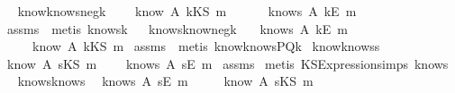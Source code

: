 \begin{isabellebody}
{\isafoldproof}\isadelimproof
\ \isanewline
\endisadelimproof
\isanewline
{}\isamarkupfalse \ know{}knows{\isacharunderscore}neg{\isacharunderscore}k{\isacharcolon}\ \isanewline
{}\ \ {\isachardoublequoteopen}{\isasymnot}\ know\ A\ {\isacharparenleft}kKS\ m{\isacharparenright}{\isachardoublequoteclose}\isanewline
{}\ \ \ \ \ {\isachardoublequoteopen}{\isasymnot}\ knows\ A\ {\isacharbrackleft}kE\ m{\isacharbrackright}{\isachardoublequoteclose}\isanewline
\isadelimproof
\endisadelimproof
\isatagproof
{}\isamarkupfalse \ assms\ \isamarkupfalse \ {\isacharparenleft}metis\ knows{}k{\isacharparenright}\endisatagproof
{\isafoldproof}\isadelimproof
\ \isanewline
\endisadelimproof
\isanewline
{}\isamarkupfalse \ knows{}know{\isacharunderscore}neg{\isacharunderscore}k{\isacharcolon}\ \isanewline
{}\ {\isachardoublequoteopen}{\isasymnot}\ knows\ A\ {\isacharbrackleft}kE\ m{\isacharbrackright}{\isachardoublequoteclose}\ \isanewline
{}\ \ \ \ {\isachardoublequoteopen}{\isasymnot}\ know\ A\ {\isacharparenleft}kKS\ m{\isacharparenright}{\isachardoublequoteclose}\isanewline
\isadelimproof
\endisadelimproof
\isatagproof
{}\isamarkupfalse \ assms\ \isamarkupfalse \ {\isacharparenleft}metis\ know{}knowsPQ{\isacharunderscore}k{\isacharparenright}\endisatagproof
{\isafoldproof}\isadelimproof
\isanewline
\endisadelimproof
\isanewline
{}\isamarkupfalse \ know{}knows{\isacharunderscore}s{\isacharcolon}\ \isanewline
{}\ {\isachardoublequoteopen}know\ A\ {\isacharparenleft}sKS\ m{\isacharparenright}{\isachardoublequoteclose}\isanewline
{}\ \ \ \ {\isachardoublequoteopen}knows\ A\ {\isacharbrackleft}sE\ m{\isacharbrackright}{\isachardoublequoteclose}\isanewline
\isadelimproof
\endisadelimproof
\isatagproof
{}\isamarkupfalse \ assms\isanewline
{}\isamarkupfalse \ {\isacharparenleft}metis\ KS{}Expression{\isachardot}simps{\isacharparenleft}{}{\isacharparenright}\ know{}s{\isacharparenright}\endisatagproof
{\isafoldproof}\isadelimproof
\ \isanewline
\endisadelimproof
\isanewline
{}\isamarkupfalse \ knows{}know{\isacharunderscore}s{\isacharcolon}\ \isanewline
{}\ {\isachardoublequoteopen}knows\ A\ {\isacharbrackleft}sE\ m{\isacharbrackright}{\isachardoublequoteclose}\ \isanewline
{}\ \ \ \ {\isachardoublequoteopen}know\ A\ {\isacharparenleft}sKS\ m{\isacharparenright}{\isachardoublequoteclose}\isanewline

\end{isabellebody}

